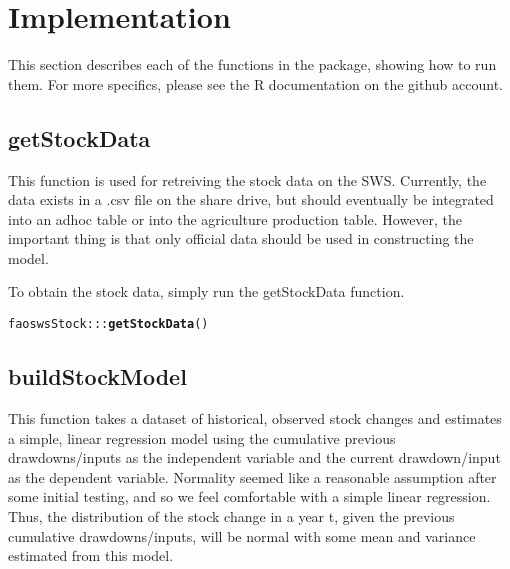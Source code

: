 \documentclass[nojss]{jss}\usepackage[]{graphicx}\usepackage[]{color}
\makeatletter
\newcommand{\hlopt}[1]{\textcolor[rgb]{0,0,0}{#1}}%
\newcommand{\hlstd}[1]{\textcolor[rgb]{0.345,0.345,0.345}{#1}}%
\newcommand{\hlkwd}[1]{\textcolor[rgb]{0.737,0.353,0.396}{\textbf{#1}}}%
\newenvironment{kframe}{%
 \def\at@end@of@kframe{}%
 \ifinner\ifhmode%
  \def\at@end@of@kframe{\end{minipage}}%
  \begin{minipage}{\columnwidth}%
 \fi\fi%
 \def\FrameCommand##1{\hskip\@totalleftmargin \hskip-\fboxsep
 \colorbox{shadecolor}{##1}\hskip-\fboxsep
     \hskip-\linewidth \hskip-\@totalleftmargin \hskip\columnwidth}%
 \MakeFramed {\advance\hsize-\width
   \@totalleftmargin\z@ \linewidth\hsize
   \@setminipage}}%
 {\par\unskip\endMakeFramed%
 \at@end@of@kframe}
\newenvironment{knitrout}{}{} %
\makeatother
\begin{document}
\section{Implementation}

This section describes each of the functions in the package, showing how to run them.  For more specifics, please see the R documentation on the github account.

\subsection{getStockData}

This function is used for retreiving the stock data on the SWS.  Currently, the data exists in a .csv file on the share drive, but should eventually be integrated into an adhoc table or into the agriculture production table.  However, the important thing is that only official data should be used in constructing the model.

To obtain the stock data, simply run the getStockData function.

\begin{knitrout}
\color{fgcolor}\begin{kframe}
\begin{alltt}
\hlstd{faoswsStock}\hlopt{:::}\hlkwd{getStockData}\hlstd{()}
\end{alltt}


{\ttfamily\noindent\bfseries\color{errorcolor}{\#\# Error in faoswsStock:::getStockData(): No directory set up for this user yet!}}\end{kframe}
\end{knitrout}

\subsection{buildStockModel}

This function takes a dataset of historical, observed stock changes and estimates a simple, linear regression model using the cumulative previous drawdowns/inputs as the independent variable and the current drawdown/input as the dependent variable. Normality seemed like a reasonable assumption after some initial testing, and so we feel comfortable with a simple linear regression. Thus, the distribution of the stock change in a year t, given the previous cumulative drawdowns/inputs, will be normal with some mean and variance estimated from this model.
\end{document}
